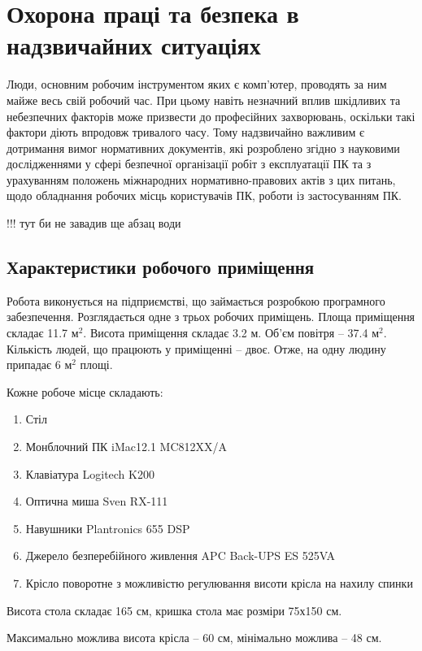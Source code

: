 \documentclass[a4paper,12pt]{article}
\begin{document}
\onehalfspacing
\large

\section{Охорона праці та безпека в надзвичайних ситуаціях}

Люди, основним робочим інструментом яких є комп’ютер, проводять за ним майже весь свій робочий час. При цьому навіть незначний вплив шкідливих та небезпечних факторів може призвести до професійних захворювань, оскільки такі фактори діють впродовж тривалого часу. Тому надзвичайно важливим є дотримання вимог нормативних документів, які розроблено згідно з  науковими дослідженнями у сфері безпечної організації робіт з експлуатації ПК та з урахуванням положень міжнародних нормативно-правових актів з цих питань, щодо обладнання робочих місць користувачів ПК, роботи із застосуванням ПК.

!!! тут би не завадив ще абзац води

\subsection{Характеристики робочого приміщення}
Робота виконується на підприємстві, що займається розробкою програмного забезпечення. Розглядається одне з трьох робочих приміщень. Площа приміщення складає 11.7 $\text{м}^2$. Висота приміщення складає 3.2 м. Об’єм повітря -- 37.4 $\text{м}^2$. Кількість людей, що працюють у приміщенні -- двоє. Отже, на одну людину припадає 6 $\text{м}^2$ площі.

Кожне робоче місце складають:
\begin{enumerate}
\item Стіл
\item Монблочний ПК iMac12.1 MC812XX/A
\item Клавіатура Logitech K200
\item Оптична миша Sven RX-111
\item Навушники Plantronics 655 DSP
\item Джерело безперебійного живлення APC Back-UPS ES 525VA
\item Крісло поворотне з можливістю регулювання висоти крісла на нахилу спинки
\end{enumerate}

Висота стола складає 165 см, кришка стола має розміри 75х150 см.

Максимально можлива висота крісла -- 60 см, мінімально можлива -- 48 см.
\end{document}
